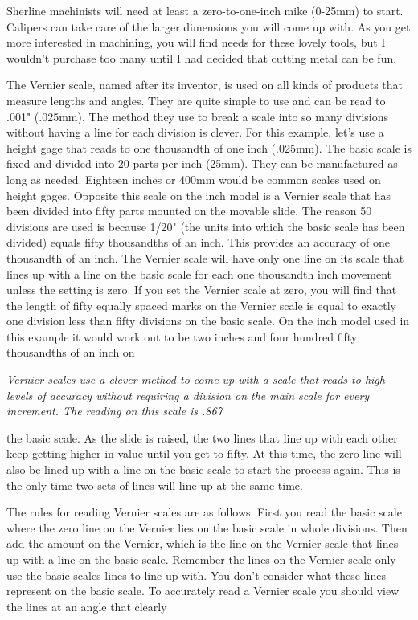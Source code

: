 Sherline machinists will need at least a zero-to-one-inch mike (0-25mm) to
start. Calipers can take care of the larger dimensions you will come up with. As
you get more interested in machining, you will find needs for these lovely
tools, but I wouldn't purchase too many until I had decided that cutting metal
can be fun.


The Vernier scale, named after its inventor, is used on all kinds of products
that measure lengths and angles. They are quite simple to use and can be read to
.001" (.025mm). The method they use to break a scale into so many divisions
without having a line for each division is clever. For this example, let's use a
height gage that reads to one thousandth of one inch (.025mm). The basic scale
is fixed and divided into 20 parts per inch (25mm). They can be manufactured as
long as needed. Eighteen inches or 400mm would be common scales used on height
gages. Opposite this scale on the inch model is a Vernier scale that has been
divided into fifty parts mounted on the movable slide. The reason 50 divisions
are used is because 1/20" (the units into which the basic scale has been
divided) equals fifty thousandths of an inch. This provides an accuracy of one
thousandth of an inch. The Vernier scale will have only one line on its scale
that lines up with a line on the basic scale for each one thousandth inch
movement unless the setting is zero. If you set the Vernier scale at zero, you
will find that the length of fifty equally spaced marks on the Vernier scale is
equal to exactly one division less than fifty divisions on the basic scale. On
the inch model used in this example it would work out to be two inches and four
hundred fifty thousandths of an inch on

\bigskip
\textit{Vernier scales use a clever method to come up with a scale that reads to
high levels of accuracy without requiring a division on the main scale for every
increment. The reading on this scale is .867}
\bigskip

the basic scale. As the slide is raised, the two lines that line up with each
other keep getting higher in value until you get to fifty. At this time, the
zero line will also be lined up with a line on the basic scale to start the
process again. This is the only time two sets of lines will line up at the same
time.

The rules for reading Vernier scales are as follows: First you read the basic
scale where the zero line on the Vernier lies on the basic scale in whole
divisions. Then add the amount on the Vernier, which is the line on the Vernier
scale that lines up with a line on the basic scale. Remember the lines on the
Vernier scale only use the basic scales lines to line up with. You don't
consider what these lines represent on the basic scale. To accurately read a
Vernier scale you should view the lines at an angle that clearly

